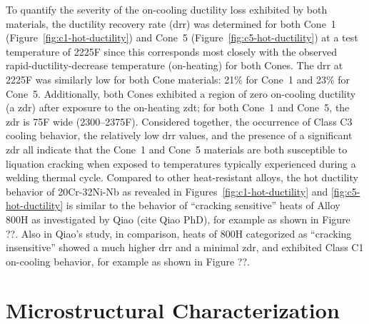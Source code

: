 To quantify the severity of the on-cooling ductility loss exhibited by both materials, the ductility recovery rate (\gls{drr}) was determined for both Cone~1 (Figure~\ref{fig:c1-hot-ductility}) and Cone~5 (Figure~\ref{fig:c5-hot-ductility}) at a test temperature of 2225\textdegree{}F since this corresponds most closely with the observed rapid-ductility-decrease temperature (on-heating) for both Cones.  The \gls{drr} at 2225\textdegree{}F was similarly low for both Cone materials: 21\% for Cone~1 and 23\% for Cone~5.  Additionally, both Cones exhibited a region of zero on-cooling ductility (a \gls{zdr}) after exposure to the on-heating \gls{zdt}; for both Cone~1 and Cone~5, the \gls{zdr} is 75F\textdegree{} wide (2300–2375\textdegree{}F).  Considered together, the occurrence of Class C3 cooling behavior, the relatively low \gls{drr} values, and the presence of a significant \gls{zdr} all indicate that the Cone~1 and Cone~5 materials are both susceptible to liquation cracking when exposed to temperatures typically experienced during a welding thermal cycle. Compared to other heat-resistant alloys, the hot ductility behavior of 20Cr-32Ni-Nb as revealed in Figures~\ref{fig:c1-hot-ductility} and \ref{fig:c5-hot-ductility} is similar to the behavior of ``cracking sensitive'' heats of Alloy 800H as investigated by Qiao (cite Qiao PhD), for example as shown in Figure ??. Also in Qiao's study, in comparison, heats of 800H categorized as ``cracking insensitive'' showed a much higher \gls{drr} and a minimal \gls{zdr}, and exhibited Class C1 on-cooling behavior, for example as shown in Figure ??.


\section{Microstructural Characterization}
